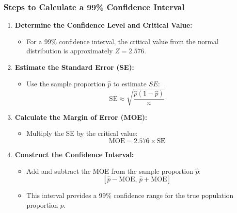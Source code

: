 \documentclass[handout]{beamer} %
\begin{document}
\begin{frame}
    \frametitle{Steps to Calculate a 99\% Confidence Interval}
    \begin{enumerate}
        \item \textbf{Determine the Confidence Level and Critical Value:}
        \begin{itemize}
            \item For a 99\% confidence interval, the critical value from the normal distribution is approximately \( Z = 2.576 \).
        \end{itemize}
        
        \item \textbf{Estimate the Standard Error (SE):}
        \begin{itemize}
            \item Use the sample proportion \( \hat{p} \) to estimate \( SE \): 
            \[
            \text{SE} \approx \sqrt{\frac{\hat{p}(1 - \hat{p})}{n}}
            \]
        \end{itemize}

        \item \textbf{Calculate the Margin of Error (MOE):}
        \begin{itemize}
            \item Multiply the SE by the critical value:
            \[
            \text{MOE} = 2.576 \times \text{SE}
            \]
        \end{itemize}

        \item \textbf{Construct the Confidence Interval:}
        \begin{itemize}
            \item Add and subtract the MOE from the sample proportion \( \hat{p} \):
            \[
            \left[ \hat{p} - \text{MOE}, \, \hat{p} + \text{MOE} \right]
            \]
            \item This interval provides a 99\% confidence range for the true population proportion \( p \).
        \end{itemize}
    \end{enumerate}
\end{frame}
\end{document}
